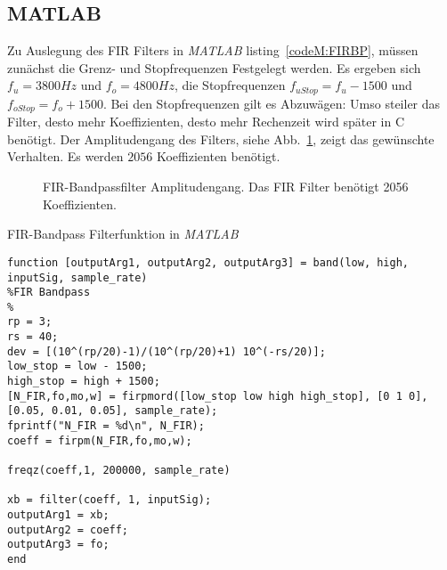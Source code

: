 \documentclass{article}
\begin{document}
\subsection{MATLAB}
Zu Auslegung des FIR Filters in \textit{MATLAB} listing~\ref{codeM:FIRBP}, müssen zunächst die Grenz- und Stopfrequenzen Festgelegt werden.
Es ergeben sich $f_u = 3800Hz$ und $f_o = 4800Hz$, die Stopfrequenzen $f_{uStop} = f_u - 1500$ und $f_{oStop} = f_o + 1500$.
Bei den Stopfrequenzen gilt es Abzuwägen: Umso steiler das Filter, desto mehr Koeffizienten, desto mehr Rechenzeit wird später in C
benötigt. Der Amplitudengang des Filters, siehe Abb.~\ref{fig:fir_ampli}, zeigt das gewünschte Verhalten. Es werden $2056$ Koeffizienten benötigt.

\begin{figure}[!h]
    \label{fig:fir_ampli}
    \centering
    \def\svgscale{0.3}
    \def\svgwidth{\columnwidth}
    \caption{FIR-Bandpassfilter Amplitudengang. Das FIR Filter benötigt 2056 Koeffizienten.}
\end{figure}
\begin{listing}\label{codeM:FIRBP}
    \caption{FIR-Bandpass Filterfunktion in \textit{MATLAB}}
    \begin{verbatim}
function [outputArg1, outputArg2, outputArg3] = band(low, high, inputSig, sample_rate)
%FIR Bandpass
%
rp = 3; 
rs = 40;
dev = [(10^(rp/20)-1)/(10^(rp/20)+1) 10^(-rs/20)]; 
low_stop = low - 1500;
high_stop = high + 1500;
[N_FIR,fo,mo,w] = firpmord([low_stop low high high_stop], [0 1 0], [0.05, 0.01, 0.05], sample_rate);
fprintf("N_FIR = %d\n", N_FIR);
coeff = firpm(N_FIR,fo,mo,w);

freqz(coeff,1, 200000, sample_rate)

xb = filter(coeff, 1, inputSig);
outputArg1 = xb;
outputArg2 = coeff;
outputArg3 = fo;
end
    \end{verbatim}
\end{listing}
\end{document}
